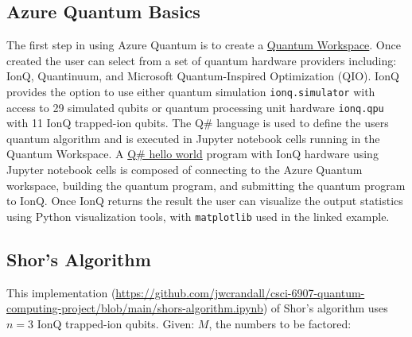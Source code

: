 \documentclass[main.tex]{subfiles}
\begin{document}
\subsection{Azure Quantum Basics} 

    The first step in using Azure Quantum is to create a \href{https://portal.azure.com/#create/Microsoft.AzureQuantum}{Quantum Workspace}. Once created the user can select from a set of quantum hardware providers including: IonQ, Quantinuum, and Microsoft Quantum-Inspired Optimization (QIO). IonQ provides the option to use either quantum simulation \texttt{ionq.simulator} with access to 29  simulated qubits or quantum processing unit hardware \texttt{ionq.qpu} with 11 IonQ trapped-ion qubits. The Q\# language is used to define the users quantum algorithm and is executed in Jupyter notebook cells running in the Quantum Workspace. A  \href{https://github.com/jwcrandall/csci-6907-quantum-computing-project/blob/main/hello-world-qsharp-ionq.ipynb}{Q\# hello world} program with IonQ hardware using Jupyter notebook cells is composed of connecting to the Azure Quantum workspace, building the quantum program, and submitting the quantum program to IonQ. Once IonQ returns the result the user can visualize the output statistics using Python visualization tools, with \texttt{matplotlib} used in the linked example.
    

\subsection{Shor's Algorithm}

    This implementation (\url{https://github.com/jwcrandall/csci-6907-quantum-computing-project/blob/main/shors-algorithm.ipynb}) of Shor's algorithm uses $n=3$ IonQ trapped-ion qubits. Given: $M$, the numbers to be factored:
    
\end{document}
